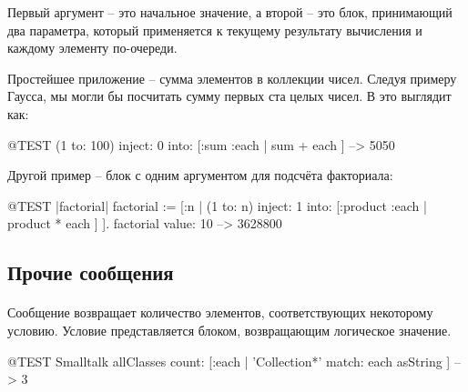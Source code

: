 \documentclass[a4paper,10pt,twoside]{book}
\begin{document}
Первый аргумент -- это начальное значение, а второй -- это блок, принимающий два параметра, который применяется к текущему результату вычисления и каждому элементу по-очереди.

Простейшее приложение  -- сумма элементов в коллекции чисел.
Следуя примеру Гаусса, мы могли бы посчитать сумму первых ста целых чисел. В \pharo это выглядит как:
\begin{code}{@TEST}
(1 to: 100) inject: 0 into: [:sum :each | sum + each ] --> 5050
\end{code}

Другой пример -- блок с одним аргументом для подсчёта факториала:
\begin{code}{@TEST |factorial|}
factorial := [:n | (1 to: n) inject: 1 into: [:product :each | product * each ] ].
factorial value: 10 --> 3628800
\end{code}

\subsection{Прочие сообщения}

\paragraph{} Сообщение  возвращает количество элементов, соответствующих некоторому условию. Условие представляется блоком, возвращающим логическое значение.

\begin{code}{@TEST}
Smalltalk allClasses count: [:each | 'Collection*' match: each asString ] --> 3
\end{code}
\end{document}

